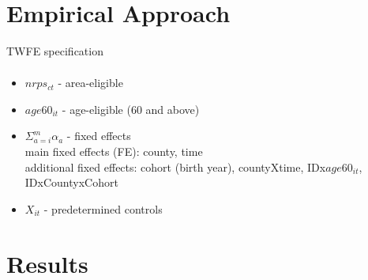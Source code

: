 \documentclass[handout] %
{beamer}
\begin{document}
\section{Empirical Approach} 









\begin{frame}{TWFE specification
}
\begin{align*}
    
\end{align*}


\pause
\begin{itemize}
    \item $nrps_{ct}$ - area-eligible %
    \item $age60_{it}$ - age-eligible (60 and above)
    \pause
    \item $%
    \Sigma_{a=i}^m \alpha_a$
    - fixed effects \\ 
    main fixed effects (FE): county, time \\ 
    additional fixed effects: cohort (birth year), countyXtime, IDx$age60_{it}$, IDxCountyxCohort
    \pause
    \item $X_{it}$ - predetermined controls 
\end{itemize}
\end{frame}








\section{Results} 
\end{document}
